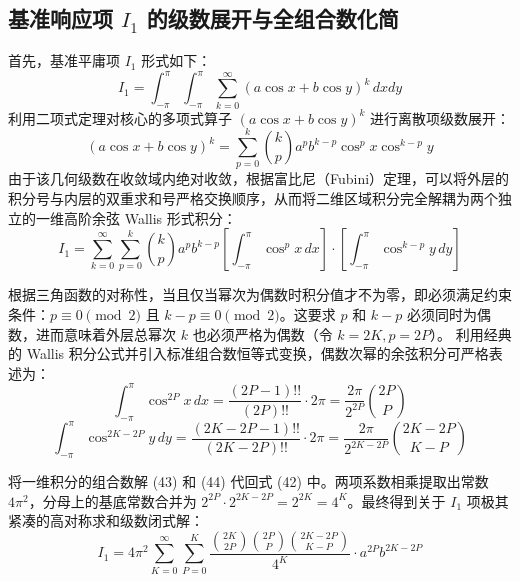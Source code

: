 \documentclass[11pt,a4paper]{ctexart}
\begin{document}
\subsection{基准响应项 $I_1$ 的级数展开与全组合数化简}
首先，基准平庸项 $I_1$ 形式如下：
\begin{equation}
I_1 = \int_{-\pi}^{\pi} \int_{-\pi}^{\pi} \sum_{k=0}^{\infty} (a \cos x + b \cos y)^k \, dx dy
\end{equation}
利用二项式定理对核心的多项式算子 $(a \cos x + b \cos y)^k$ 进行离散项级数展开：
\begin{equation}
(a \cos x + b \cos y)^k = \sum_{p=0}^{k} \binom{k}{p} a^p b^{k-p} \cos^p x \cos^{k-p} y
\end{equation}
由于该几何级数在收敛域内绝对收敛，根据富比尼（Fubini）定理，可以将外层的积分号与内层的双重求和号严格交换顺序，从而将二维区域积分完全解耦为两个独立的一维高阶余弦 Wallis 形式积分：
\begin{equation}
I_1 = \sum_{k=0}^{\infty} \sum_{p=0}^{k} \binom{k}{p} a^p b^{k-p} \left[ \int_{-\pi}^{\pi} \cos^p x \, dx \right] \cdot \left[ \int_{-\pi}^{\pi} \cos^{k-p} y \, dy \right]
\end{equation}

根据三角函数的对称性，当且仅当幂次为偶数时积分值才不为零，即必须满足约束条件：$p \equiv 0 \pmod 2$ 且 $k-p \equiv 0 \pmod 2$。这要求 $p$ 和 $k-p$ 必须同时为偶数，进而意味着外层总幂次 $k$ 也必须严格为偶数（令 $k=2K, p=2P$）。
利用经典的 Wallis 积分公式并引入标准组合数恒等式变换，偶数次幂的余弦积分可严格表述为：
\begin{equation}
\int_{-\pi}^{\pi} \cos^{2P} x \, dx = \frac{(2P-1)!!}{(2P)!!} \cdot 2\pi = \frac{2\pi}{2^{2P}} \binom{2P}{P}
\end{equation}
\begin{equation}
\int_{-\pi}^{\pi} \cos^{2K-2P} y \, dy = \frac{(2K-2P-1)!!}{(2K-2P)!!} \cdot 2\pi = \frac{2\pi}{2^{2K-2P}} \binom{2K-2P}{K-P}
\end{equation}

将一维积分的组合数解 (43) 和 (44) 代回式 (42) 中。两项系数相乘提取出常数 $4\pi^2$，分母上的基底常数合并为 $2^{2P} \cdot 2^{2K-2P} = 2^{2K} = 4^K$。最终得到关于 $I_1$ 项极其紧凑的高对称求和级数闭式解：
\begin{equation}
I_1 = 4\pi^2 \sum_{K=0}^{\infty} \sum_{P=0}^{K} \frac{\binom{2K}{2P} \binom{2P}{P} \binom{2K-2P}{K-P}}{4^K} \cdot a^{2P} b^{2K-2P}
\end{equation}
\end{document}
